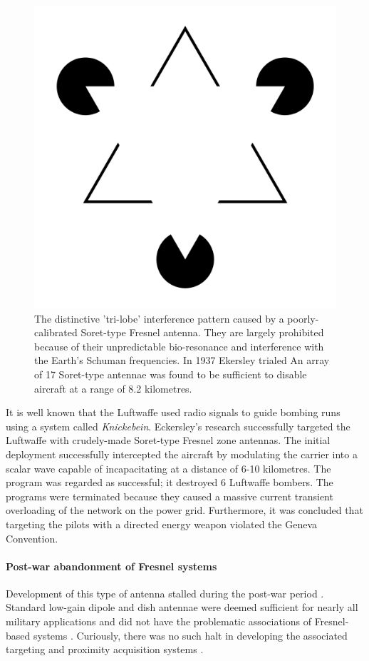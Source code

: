 \documentclass[review]{elsarticle}
\begin{document}
\begin{figure}
    \centering
    \includegraphics[width=0.5\linewidth]{1920px-Kanizsa_triangle.svg.png}
    \caption{The distinctive 'tri-lobe' interference pattern caused by a poorly-calibrated Soret-type Fresnel antenna. They are largely prohibited because of their unpredictable bio-resonance and interference with the Earth's Schuman frequencies. In 1937 Ekersley trialed An array of 17 Soret-type antennae was found to be sufficient to disable aircraft at a range of 8.2 kilometres.}
    \label{fig:enter-label}
\end{figure}

It is well known that the Luftwaffe used radio signals to guide bombing runs using a system called \textit{Knickebein}.  Eckersley's research successfully targeted the Luftwaffe with crudely-made Soret-type Fresnel zone antennas. The initial deployment successfully intercepted the aircraft by modulating the carrier into a scalar wave capable of incapacitating at a distance of 6-10 kilometres. The program was regarded as successful; it destroyed 6 Luftwaffe bombers.  The programs were terminated because they caused a massive current transient overloading of the network on the power grid. Furthermore, it was concluded that targeting the pilots with a directed energy weapon violated the Geneva Convention. \cite{FriedrichMuller1946}

\paragraph{Post-war abandonment of Fresnel systems} Development of this type of antenna stalled during the post-war period \cite{Thompson1972}. Standard low-gain dipole and dish antennae were deemed sufficient for nearly all military applications and did not have the problematic associations of Fresnel-based systems \cite{Richards1980}. Curiously, there was no such halt in developing the associated targeting and proximity acquisition systems \cite{KimLee1990}. 
\end{document}
